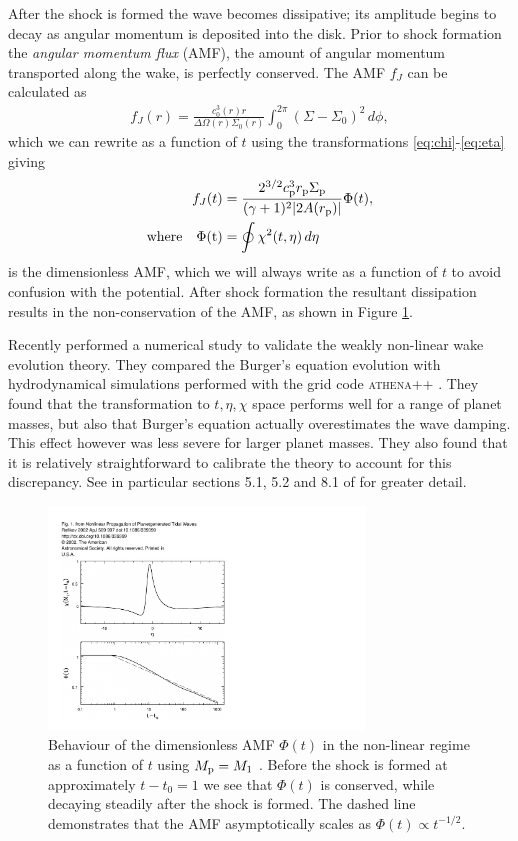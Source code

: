 After the shock is formed the wave becomes dissipative;
its amplitude begins to decay as angular momentum is deposited into the disk.
Prior to shock formation the \textit{angular momentum flux} (AMF), the amount of angular momentum transported along the wake, is perfectly conserved.
The AMF $f_J$ can be calculated as \citep{rafikov2002a}
\begin{align}
    f_J(r) = \frac{c_0^3(r) r}{\Delta\Omega(r)\Sigma_0(r)} \int_0^{2\pi} \left( \Sigma - \Sigma_0 \right)^2 \, d\phi,
\end{align}
which we can rewrite as a function of $t$ using the transformations \ref{eq:chi}-\ref{eq:eta} giving
\begin{align}
    f_J(t) &= \frac{2^{3/2} c_{\rm p}^3 r_{\rm p} \Sigma_{\rm p}}{(\gamma + 1)^2 |2 A(r_{\rm p})|} \Phi(t), \\
    \rm{where} \quad \Phi(t) &= \oint \chi^2(t,\eta) \, d\eta 
\end{align}
is the dimensionless AMF, which we will always write as a function of $t$ to avoid confusion with the potential.
After shock formation the resultant dissipation results in the non-conservation of the AMF, as shown in Figure \ref{fig:AMF}.

Recently \citet{cimerman2021} performed a numerical study to validate the weakly non-linear wake evolution theory.
They compared the Burger's equation evolution with hydrodynamical simulations performed with the grid code \textsc{athena++} \citep{stone2020}.
They found that the transformation to $t,\eta,\chi$ space performs well for a range of planet masses, but also that Burger's equation actually overestimates the wave damping.
This effect however was less severe for larger planet masses.
They also found that it is relatively straightforward to calibrate the theory to account for this discrepancy.
See in particular sections 5.1, 5.2 and 8.1 of \citet{cimerman2021} for greater detail.
\begin{figure}
    \centering
    \includegraphics[width = 0.75\textwidth]{figures/AMF_burgers.pdf}
    \caption{Behaviour of the dimensionless AMF $\Phi(t)$ in the non-linear regime as a function of $t$ using $M_{\rm p} = M_1$ \citep[solid line;][]{rafikov2002a}.
    Before the shock is formed at approximately $t-t_0=1$ we see that $\Phi(t)$ is conserved, while decaying steadily after the shock is formed.
    The dashed line demonstrates that the AMF asymptotically scales as $\Phi(t) \propto t^{-1/2}$.
    }
    \label{fig:AMF}
\end{figure}

